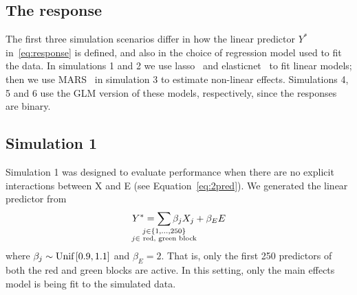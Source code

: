 


\subsection{The response}
The first three simulation scenarios differ in how the linear predictor $Y^*$ in~\eqref{eq:response} is defined, and also in the choice of regression model used to fit the data. In simulations 1 and 2 we use lasso~\citep{tibshirani1996regression} and elasticnet~\citep{zou2005regularization} to fit linear models; then we use MARS~\citep{friedman1991multivariate} in simulation 3 to estimate non-linear effects. Simulations 4, 5 and 6 use the GLM version of these models, respectively, since the responses are binary.

\subsection*{Simulation 1}
Simulation 1 was designed to evaluate performance when there are no explicit interactions between X and E (see Equation~\eqref{eq:2pred}). We generated the linear predictor from
\begin{equation}
Y^* = \sum_{\mathclap{\substack{j\in \left\lbrace 1, \ldots, 250 \right\rbrace\\ j \in \tm{ red, green block}}}}  \beta_j X_j + \beta_E E 
\end{equation}
where $\beta_j \sim \textrm{{Unif}}\left[ 0.9,1.1\right]$ and \mbox{$\beta_E = 2$}. That is, only the first 250 predictors of both the red and green blocks are active. In this setting, only the main effects model is being fit to the simulated data. 


